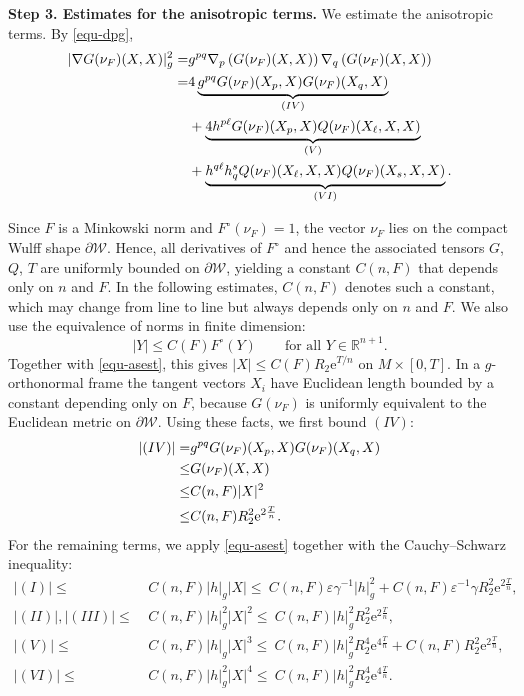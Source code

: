 \documentclass[10pt,a4paper]{amsart}
\numberwithin{equation}{section}
\begin{document}
		\textbf{Step 3. Estimates for the anisotropic terms.}
		We estimate the anisotropic terms. By \eqref{equ-dpg},
		\begin{align}
			|\nabla G(\nu_F)(X,X)|_{g}^2
			=& g^{pq}\nabla_p\left( G(\nu_F)(X,X) \right) \nabla_q\left( G(\nu_F)(X,X) \right) \notag\\
			=&  4\underbrace{g^{pq}G(\nu_F)(X_p,X)G(\nu_F)(X_q,X)}_{(IV)} \nonumber\\
			&+ \underbrace{4h^{p\ell} G(\nu_F)(X_p,X) Q(\nu_F)(X_{\ell},X,X)}_{(V)} \notag\\
			& + \underbrace{h^{q\ell}h^s_q Q(\nu_F)(X_{\ell},X,X)Q(\nu_F)(X_s,X,X)}_{(VI)}.  \label{345}
		\end{align}
		
		Since $F$ is a Minkowski norm and $F^\circ(\nu_F)=1$, the vector $\nu_F$ lies on the compact Wulff shape $\partial\mathcal{W}$. Hence, all derivatives of $F^\circ$ and hence the associated tensors $G$, $Q$, $T$ are uniformly bounded on $\partial\mathcal{W}$, yielding a constant $C(n,F)$ that depends only on $n$ and $F$. In the following estimates, $C(n,F)$ denotes such a constant, which may change from line to line but always depends only on $n$ and $F$. We also use the equivalence of norms in finite dimension:
		\begin{equation*}
			|Y|\leq C(F)F^\circ(Y)\qquad\text{for all }Y\in\mathbb R^{n+1}.
		\end{equation*}
		Together with \eqref{equ-asest}, this gives $|X|\leq C(F)R_2\mathrm{e}^{T/n}$ on $M\times[0,T]$. In a $g$-orthonormal frame the tangent vectors $X_i$ have Euclidean length bounded by a constant depending only on $F$, because $G(\nu_F)$ is uniformly equivalent to the Euclidean metric on $\partial\mathcal W$. Using these facts, we first bound $(IV)$:
		\begin{align}
			\left|(IV)\right|=&g^{pq}G(\nu_F)(X_p,X)G(\nu_F)(X_q,X) \nonumber\\
			\leq& G(\nu_F)(X,X) \notag\\
			\leq& C(n,F)|X|^2 \nonumber\\
			\leq& C(n,F)R_2^2 \mathrm{e}^{2\frac{T}{n}}. \label{3est}
		\end{align}
		For the remaining terms, we apply \eqref{equ-asest} together with the Cauchy--Schwarz inequality:
		\begin{align}	\label{1245est}
				\left|(I)\right| \leq&~  C(n,F)|h|_{g}|X|
				\leq ~C(n,F)\varepsilon\gamma^{-1}|h|_{g}^2+ C(n,F)\varepsilon^{-1}\gamma R_2^2\mathrm{e}^{2\frac{T}{n}},\nonumber\\
			\left|	(II)\right|, \left|(III)\right| \leq &~C(n,F) |h|^2_{g} |X|^2 \leq ~C(n,F) |h|^2_{g} R_2^2\mathrm{e}^{2\frac{T}{n}},\nonumber\\
				\left|(V)\right| \leq &~C(n,F) |h|_{g} |X|^3 
				\leq ~C(n,F) |h|^2_{g} R_2^4\mathrm{e}^{4\frac{T}{n}} + C(n,F)R_2^2\mathrm{e}^{2\frac{T}{n}},\nonumber\\
				\left|(VI)\right| \leq &~C(n,F) |h|^2_{g} |X|^4
				\leq ~C(n,F) |h|^2_{g} R_2^4\mathrm{e}^{4\frac{T}{n}}.
		\end{align}
\end{document}

